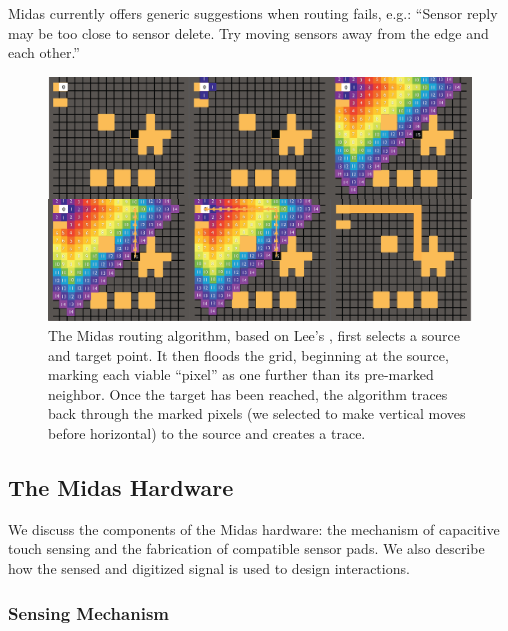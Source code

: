 Midas currently offers generic suggestions when routing fails,
e.g.: “Sensor reply may be too close to sensor delete. Try
moving sensors away from the edge and each other.”

\begin{figure}[t]
\centering
\includegraphics[width=5in]{figures/midas/routing.png}
\caption{The Midas routing algorithm, based on Lee's \cite{lee-maze}, first selects a source and target point. It then floods the grid, beginning at the source, marking each viable ``pixel'' as one further than its pre-marked neighbor. Once the target has been reached, the algorithm traces back through the marked pixels (we selected to make vertical moves before horizontal) to the source and creates a trace.} 
\label{fig:midas-routing}
\end{figure}


    \subsection{The Midas Hardware}

We discuss the components of the Midas hardware: the mechanism of capacitive touch sensing and the fabrication of compatible sensor pads. We also describe how the sensed and digitized signal is used to design interactions.

    \subsubsection{Sensing Mechanism}

